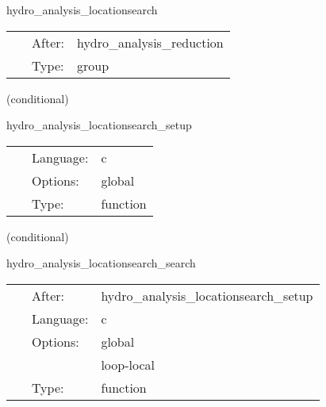 \hspace{5mm} hydro\_analysis\_locationsearch 

\hspace{5mm}{\it look for the location of the maximum density } 


\hspace{5mm}

 \begin{tabular*}{160mm}{cll} 
~ & After:  & hydro\_analysis\_reduction \\ 
~ & Type:  & group \\ 
\end{tabular*} 


\vspace{5mm}

   (conditional) 

\hspace{5mm} hydro\_analysis\_locationsearch\_setup 

\hspace{5mm}{\it prepare data structures for search } 


\hspace{5mm}

 \begin{tabular*}{160mm}{cll} 
~ & Language:  & c \\ 
~ & Options:  & global \\ 
~ & Type:  & function \\ 
\end{tabular*} 


\vspace{5mm}

   (conditional) 

\hspace{5mm} hydro\_analysis\_locationsearch\_search 

\hspace{5mm}{\it search for the location of the maximum density } 


\hspace{5mm}

 \begin{tabular*}{160mm}{cll} 
~ & After:  & hydro\_analysis\_locationsearch\_setup \\ 
~ & Language:  & c \\ 
~ & Options:  & global \\ 
~& ~ &loop-local\\ 
~ & Type:  & function \\ 
\end{tabular*} 


